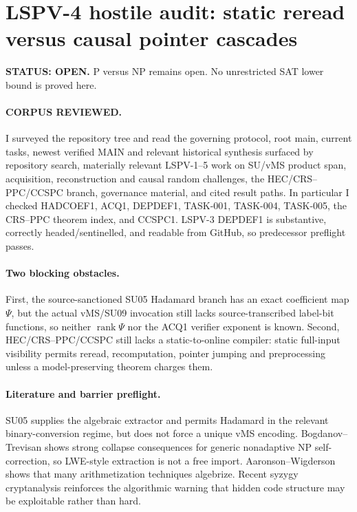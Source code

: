 \documentclass[11pt]{article}
\begin{document}
\section*{LSPV-4 hostile audit: static reread versus causal pointer cascades}
\textbf{STATUS: OPEN.} P versus NP remains open. No unrestricted SAT lower bound is proved here.

\paragraph{CORPUS REVIEWED.} I surveyed the repository tree and read the governing protocol, root main, current tasks, newest verified MAIN and relevant historical synthesis surfaced by repository search, materially relevant LSPV-1--5 work on SU/vMS product span, acquisition, reconstruction and causal random challenges, the HEC/CRS--PPC/CCSPC branch, governance material, and cited result paths. In particular I checked HADCOEF1, ACQ1, DEPDEF1, TASK-001, TASK-004, TASK-005, the CRS--PPC theorem index, and CCSPC1. LSPV-3 DEPDEF1 is substantive, correctly headed/sentinelled, and readable from GitHub, so predecessor preflight passes.

\paragraph{Two blocking obstacles.} First, the source-sanctioned SU05 Hadamard branch has an exact coefficient map $\Psi$, but the actual vMS/SU09 invocation still lacks source-transcribed label-bit functions, so neither $\operatorname{rank}\Psi$ nor the ACQ1 verifier exponent is known. Second, HEC/CRS--PPC/CCSPC still lacks a static-to-online compiler: static full-input visibility permits reread, recomputation, pointer jumping and preprocessing unless a model-preserving theorem charges them.

\paragraph{Literature and barrier preflight.} SU05 supplies the algebraic extractor and permits Hadamard in the relevant binary-conversion regime, but does not force a unique vMS encoding. Bogdanov--Trevisan shows strong collapse consequences for generic nonadaptive NP self-correction, so LWE-style extraction is not a free import. Aaronson--Wigderson shows that many arithmetization techniques algebrize. Recent syzygy cryptanalysis reinforces the algorithmic warning that hidden code structure may be exploitable rather than hard.
\end{document}
